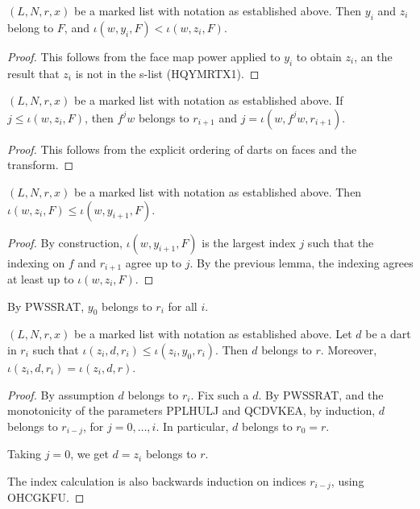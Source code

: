 \begin{lemma}
$(L,N,r,x)$ be a marked list with notation as established above.
Then $y_i$ and $z_i$ belong to $F$, and
 $\iota(w,y_i,F) < \iota(w,z_i,F)$.
\end{lemma}

\begin{proof} This follows from the face map power applied to $y_i$ to obtain $z_i$,
an the result that $z_i$ is not in the s-list (HQYMRTX1).
\end{proof}

\begin{lemma}
$(L,N,r,x)$ be a marked list with notation as established above.
If $j\le \iota(w,z_i,F)$, then $f^jw$ belongs to $r_{i+1}$ and
$j = \iota(w,f^j w,r_{i+1})$.
\end{lemma}

\begin{proof} This follows from the explicit ordering of darts on faces and the transform.
\end{proof}

\begin{lemma}
$(L,N,r,x)$ be a marked list with notation as established above.
Then $\iota(w,z_i,F) \le \iota(w,y_{i+1},F)$.
\end{lemma}

\begin{proof} By construction,  $\iota(w,y_{i+1},F)$ is the 
largest index $j$ such that the indexing on $f$ and $r_{i+1}$ agree up to $j$.
By the previous lemma, the indexing agrees at least up to $\iota(w,z_i,F)$.
\end{proof}

By PWSSRAT, $y_0$ belongs to $r_i$ for all $i$.

\begin{lemma}
$(L,N,r,x)$ be a marked list with notation as established above.
Let $d$ be a dart in $r_i$ such that
$\iota(z_i,d,r_i) \le \iota(z_i,y_0,r_i)$. Then $d$ belongs to $r$.
Moreover, $\iota(z_i,d,r_i) = \iota(z_i,d,r)$.
\end{lemma}

\begin{proof}
By assumption $d$ belongs to $r_i$.
Fix such a $d$.  By PWSSRAT, and the monotonicity of the parameters PPLHULJ and QCDVKEA,
by induction, $d$ belongs to $r_{i-j}$, for $j=0,\ldots,i$.  In particular, $d$ belongs to $r_0 = r$.

Taking $j=0$, we get $d=z_i$ belongs to $r$.

The index calculation is also backwards induction on indices $r_{i-j}$, using 
OHCGKFU.
\end{proof}

